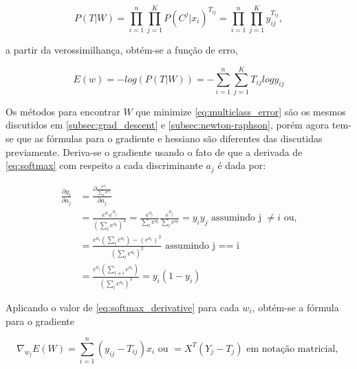 \begin{center}
	\begin{equation}
				P(T | W) = \prod_{i = 1}^{n} \prod_{j = 1}^{K} P(C^j | x_i)^{T_{ij}} = \prod_{i = 1}^{n} \prod_{j = 1}^{K} y_{ij}^{T_{ij}},
	\end{equation}
\end{center}

a partir da verossimilhança, obtém-se a função de erro,

\begin{center}
	\begin{equation}
		\label{eq:multiclass_error}
		E(w) = - log(P(T | W)) = - \sum_{i = 1}^{n} \sum_{j = 1}^{K} T_{ij} log y_{ij}
	\end{equation}
\end{center}

Os métodos para encontrar $W$ que minimize \ref{eq:multiclass_error} são os mesmos discutidos em
\ref{subsec:grad_descent} e \ref{subsec:newton-raphson}, porém agora tem-se que as fórmulas
para o gradiente e hessiano são diferentes das discutidas previamente. Deriva-se o gradiente
usando o fato de que a derivada de \ref{eq:softmax} com respeito a cada discriminante $a_j$
é dada por:


\begin{center}
	\begin{equation}
	\begin{split}\label{eq:softmax_derivative}
		\frac{\partial y_i}{\partial a_j} &= \frac{\partial \frac{e^{a_i}}{\sum_l e^{a_l}}}{\partial a_j}  \\
	& = \frac{e^{a_i}e^{a_j}}{(\sum_l e^{a_l})^2} = \frac{e^{a_i}}{\sum_l e^{a_l}}\frac{e^{a_j}}{\sum_l e^{a_l}} = y_iy_j \text{ assumindo j } \neq i  \text{ ou,}\\
	& = \frac{e^{a_i}(\sum_l e^{a_l}) - (e^{a_i})^2}{(\sum_l e^{a_l})^2} \text{ assumindo j == i} \\
	& = \frac{e^{a_i}(\sum_{l \neq i} e^{a_l})}{(\sum_l e^{a_l})^2} = y_i(1 - y_i)
	\end{split}
	\end{equation}
\end{center}

Aplicando o valor de \ref{eq:softmax_derivative} para cada $w_i$, obtém-se a fórmula para o gradiente

\begin{center}
	\begin{equation}
		\nabla_{w_j} E(W) = \sum_{i =  1}^n (y_{ij} - T_{ij})x_i \text{ ou } = X^T(Y_{j} - T_{j}) \text{ em notação matricial, }
	\end{equation}
\end{center}

